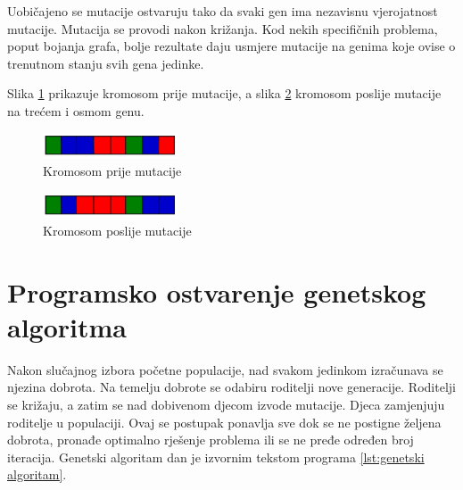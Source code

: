 \documentclass[times, utf8, zavrsni, numeric]{fer}
\begin{document}
Uobičajeno se mutacije ostvaruju tako da svaki gen ima nezavisnu vjerojatnost mutacije. Mutacija se provodi nakon križanja. Kod nekih specifičnih problema, poput bojanja grafa, bolje rezultate daju usmjere mutacije na genima koje ovise o trenutnom stanju svih gena jedinke.

Slika \ref{fig:kromosom prije mutacije} prikazuje kromosom prije mutacije, a slika \ref{fig:kromosom poslije mutacije} kromosom poslije mutacije na trećem i osmom genu.

\begin{figure}[htb]
\centering
\includegraphics[width=4cm]{images/prije_mutacije.png}
\caption{Kromosom prije mutacije}
\label{fig:kromosom prije mutacije}
\end{figure}

\begin{figure}[htb]
\centering
\includegraphics[width=4cm]{images/poslije_mutacije.png}
\caption{Kromosom poslije mutacije}
\label{fig:kromosom poslije mutacije}
\end{figure}

\section{Programsko ostvarenje genetskog algoritma}
Nakon slučajnog izbora početne populacije, nad svakom jedinkom izračunava se njezina dobrota. Na temelju dobrote se odabiru roditelji nove generacije. Roditelji se križaju, a zatim se nad dobivenom djecom izvode mutacije. Djeca zamjenjuju roditelje u populaciji. Ovaj se postupak ponavlja sve dok se ne postigne željena dobrota, pronađe optimalno rješenje problema ili se ne pređe određen broj iteracija. Genetski algoritam dan je izvornim tekstom programa \ref{lst:genetski algoritam}.
\end{document}
